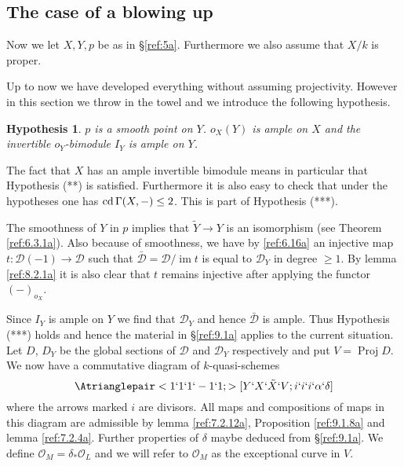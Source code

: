 \documentclass{amsproc}
\def\Dscr{{\mathcal D}}
\def\Oscr{{\mathcal O}}
\def\cd{\mathop{\text{cd}}}
\def\im{\operatorname {im}}
\def\Proj{\operatorname {Proj}}
\def\r{\rightarrow}
\let\oldtext\text
\def\text#1{\oldtext{\upshape #1}}
\newtheorem{hypothesis}{Hypothesis}
\theoremstyle{definition}
\theoremstyle{remark}
\numberwithin{equation}{section}
\numberwithin{table}{section}
\numberwithin{figure}{section}
\begin{document}
\subsection{The case of a blowing up}
\label{ref:9.2b}
Now we let $X,Y,p$ be as in \S\ref{ref:5a}.  Furthermore we also
assume that $X/k$ is proper.

Up to now we have developed everything without assuming projectivity.
 However in this section we throw in the towel and we introduce the
following hypothesis.
{\def\thehypothesis{(****)}
\begin{hypothesis}
$p$ is a smooth point on $Y$. $o_X(Y)$ is ample on $X$ and the
invertible $o_Y$-bimodule
$I_{Y}$ is ample on $Y$.
\end{hypothesis}
}
The fact that $X$ has an ample invertible bimodule means in particular
that Hypothesis (**) is satisfied. Furthermore it is also easy to
check that under the hypotheses one has $\cd \Gamma(X,-)\le 2$. This
is part of Hypothesis (***).



The smoothness of $Y$ in $p$ implies  that  $\tilde{Y}\r Y$
is an isomorphism  (see Theorem \ref{ref:6.3.1a}).
Also because of smoothness, we have by \eqref{ref:6.16a} an injective
map $t:\Dscr(-1)\r \Dscr$ such that $\bar{\Dscr}=\Dscr/\im t$ is equal
to $\Dscr_Y$ in degree $\ge 1$. By lemma \ref{ref:8.2.1a} it is
also clear that $t$ remains injective after applying the functor
$(-)_{o_X}$.

Since $I_{Y}$ is ample on $Y$ we find that $\Dscr_Y$ and hence
$\bar{\Dscr}$ is ample. Thus Hypothesis (***) holds and hence the
material in \S\ref{ref:9.1a} applies to the current situation. Let
$D$, $D_Y$ be the global sections of $\Dscr$ and $\Dscr_Y$
respectively and put $V=\Proj D$. We now have a commutative diagram of
$k$-quasi-schemes
\begin{equation}
\label{ref:9.16a}
\Atrianglepair<1`1`1`-1`1;>[Y`X`\tilde{X}`V;i`i`i`\alpha`\delta]
\end{equation}
where the arrows marked $i$ are divisors. All maps and compositions of
maps in this diagram are admissible by lemma \ref{ref:7.2.12a}, Proposition
\ref{ref:9.1.8a} and  lemma \ref{ref:7.2.4a}. Further properties of $\delta$
maybe deduced from \S\ref{ref:9.1a}. We define $\Oscr_M=\delta_\ast
\Oscr_L$ and we will refer to $\Oscr_M$ as the exceptional curve in
$V$.
\end{document}

